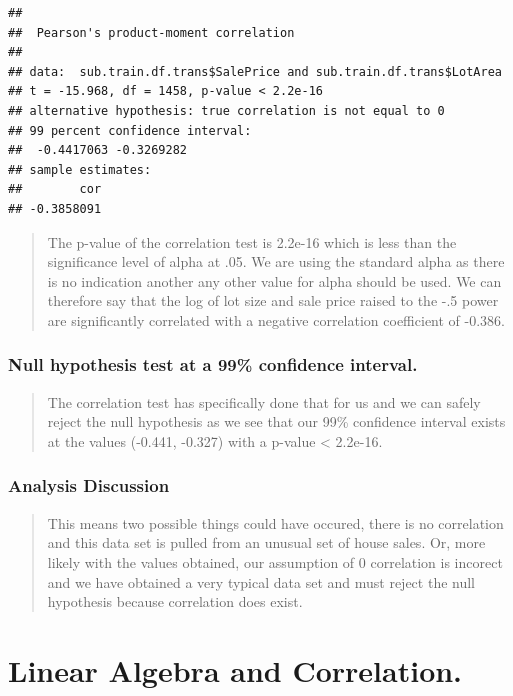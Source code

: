 \documentclass[]{article}
\begin{document}
\begin{verbatim}
## 
##  Pearson's product-moment correlation
## 
## data:  sub.train.df.trans$SalePrice and sub.train.df.trans$LotArea
## t = -15.968, df = 1458, p-value < 2.2e-16
## alternative hypothesis: true correlation is not equal to 0
## 99 percent confidence interval:
##  -0.4417063 -0.3269282
## sample estimates:
##        cor 
## -0.3858091
\end{verbatim}

\begin{quote}
The p-value of the correlation test is 2.2e-16 which is less than the
significance level of alpha at .05. We are using the standard alpha as
there is no indication another any other value for alpha should be used.
We can therefore say that the log of lot size and sale price raised to
the -.5 power are significantly correlated with a negative correlation
coefficient of -0.386.
\end{quote}

\subsubsection{Null hypothesis test at a 99\% confidence
interval.}\label{null-hypothesis-test-at-a-99-confidence-interval.}

\begin{quote}
The correlation test has specifically done that for us and we can safely
reject the null hypothesis as we see that our 99\% confidence interval
exists at the values (-0.441, -0.327) with a p-value \textless{}
2.2e-16.
\end{quote}

\subsubsection{Analysis Discussion}\label{analysis-discussion}

\begin{quote}
This means two possible things could have occured, there is no
correlation and this data set is pulled from an unusual set of house
sales. Or, more likely with the values obtained, our assumption of 0
correlation is incorect and we have obtained a very typical data set and
must reject the null hypothesis because correlation does exist.
\end{quote}

\newpage

\section{Linear Algebra and
Correlation.}\label{linear-algebra-and-correlation.}
\end{document}
